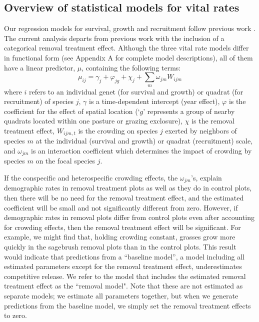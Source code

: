 \documentclass[11pt]{article}
\begin{document}
\begin{doublespacing}
\subsection*{Overview of statistical models for vital rates}

Our regression models for survival, growth and recruitment follow previous work \citep{adler_coexistence_2010,chu_large_2015}. The current analysis departs from previous work with the inclusion of a categorical removal treatment effect. Although the three vital rate models differ in functional form (see Appendix A for complete model descriptions), all of them have a linear predictor, $\mu$, containing the following terms:
\begin{equation}
\mu_{ij} = \gamma_j+ \varphi_{jg}+  \chi_j  + \sum \limits_{m} \omega_{jm} {W}_{ijm}
\label{eqn:survReg}
\end{equation}
where $i$ refers to an individual genet (for survival and growth) or quadrat (for recruitment) of species $j$, $\gamma$ is a time-dependent intercept (year effect), $\varphi$ is the coefficient for the effect of spatial location (`$g$' represents a group of nearby quadrats located within one pasture or grazing exclosure), $\chi$ is the removal treatment effect, 
$W_{ijm,t}$ is the crowding on species $j$ exerted by neighbors of species $m$ at the individual (survival and growth) or
quadrat (recruitment) scale, and $\omega_{jm}$ is an interaction coefficient which determines the impact of crowding by species $m$ on the 
focal species $j$. 

If the conspecific and heterospecific crowding effects, the $\omega_{jm}$'s, explain demographic rates in removal treatment plots as well as they do in control plots, then there will be no need for the removal treatment effect, and the estimated coefficient will be small and not significantly different from zero. However, if demographic rates in removal plots differ from control plots even after accounting for crowding effects, then the removal treatment effect will be significant. For example, we might find that, holding crowding constant, grasses grow more quickly in the sagebrush removal plots than in the control plots. This result would indicate that predictions from a ``baseline model'', a model including all estimated parameters except for the removal treatment effect, underestimates competitive release. We refer to the model that includes the estimated removal treatment effect as the ``removal model". Note that these are not estimated as separate models; we estimate all parameters together, but when we generate predictions from the baseline model, we simply set the removal treatment effects to zero.


\end{doublespacing}
\end{document}
